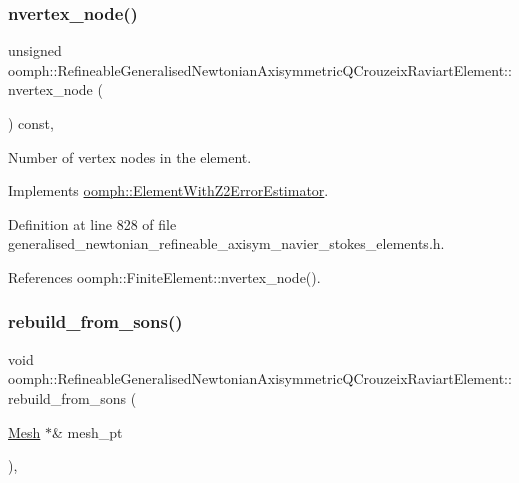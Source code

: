\subsubsection{\texorpdfstring{nvertex\+\_\+node()}{nvertex\_node()}}
{\footnotesize\ttfamily unsigned oomph\+::\+Refineable\+Generalised\+Newtonian\+Axisymmetric\+Q\+Crouzeix\+Raviart\+Element\+::nvertex\+\_\+node (\begin{DoxyParamCaption}{ }\end{DoxyParamCaption}) const\hspace{0.3cm}{\ttfamily [inline]}, {\ttfamily [virtual]}}



Number of vertex nodes in the element. 



Implements \hyperlink{classoomph_1_1ElementWithZ2ErrorEstimator_a19495a0e77ef4ff35f15fdf7913b4077}{oomph\+::\+Element\+With\+Z2\+Error\+Estimator}.



Definition at line 828 of file generalised\+\_\+newtonian\+\_\+refineable\+\_\+axisym\+\_\+navier\+\_\+stokes\+\_\+elements.\+h.



References oomph\+::\+Finite\+Element\+::nvertex\+\_\+node().

\mbox{\label{classoomph_1_1RefineableGeneralisedNewtonianAxisymmetricQCrouzeixRaviartElement_a6e5fafc449c2e81723bbbb9cfba74764}} 
\subsubsection{\texorpdfstring{rebuild\+\_\+from\+\_\+sons()}{rebuild\_from\_sons()}}
{\footnotesize\ttfamily void oomph\+::\+Refineable\+Generalised\+Newtonian\+Axisymmetric\+Q\+Crouzeix\+Raviart\+Element\+::rebuild\+\_\+from\+\_\+sons (\begin{DoxyParamCaption}\item[{\hyperlink{classoomph_1_1Mesh}{Mesh} $\ast$\&}]{mesh\+\_\+pt }\end{DoxyParamCaption})\hspace{0.3cm}{\ttfamily [inline]}, {\ttfamily [virtual]}}



